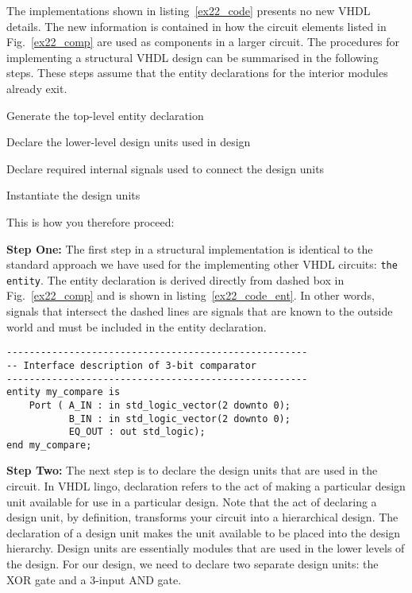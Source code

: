 The implementations shown in listing~\ref{ex22_code} presents no new VHDL details. The new information is contained in how the circuit elements listed in Fig.~\ref{ex22_comp} are used as components in a larger circuit. The procedures for implementing a structural VHDL design can be summarised in the following steps. These steps assume that the entity declarations for the interior modules already exit.
\begin{my_list}
\item Generate the top-level entity declaration
\item Declare the lower-level design units used in design
\item Declare required internal signals used to connect the design units
\item Instantiate the design units
\end{my_list}
This is how you therefore proceed:

\noindent
\textbf{Step One:} The first step in a structural implementation is identical to the standard approach we have used for the implementing other VHDL circuits: \texttt{the entity}. The entity declaration is derived directly from dashed box in Fig.~\ref{ex22_comp} and is shown in listing~\ref{ex22_code_ent}. In other words, signals that intersect the dashed lines are signals that are known to the outside world and must be included in the entity declaration.
\newpage
\clearpage
\begin{lstlisting}[label=ex22_code_ent, caption=Entity declaration for 3-bit comparator.]
-----------------------------------------------------
-- Interface description of 3-bit comparator
-----------------------------------------------------
entity my_compare is
    Port ( A_IN : in std_logic_vector(2 downto 0);
           B_IN : in std_logic_vector(2 downto 0);
           EQ_OUT : out std_logic);
end my_compare;
\end{lstlisting}

\noindent
\textbf{Step Two:} The next step is to declare the design units that are used in the circuit. In VHDL lingo, declaration refers to the act of making a particular design unit available for use in a particular design. Note that the act of declaring a design unit, by definition, transforms your circuit into a hierarchical design. The declaration of a design unit makes the unit available to be placed into the design hierarchy. Design units are essentially modules that are used in the lower levels of the design. For our design, we need to declare two separate design units: the XOR gate and a 3-input AND gate.  

